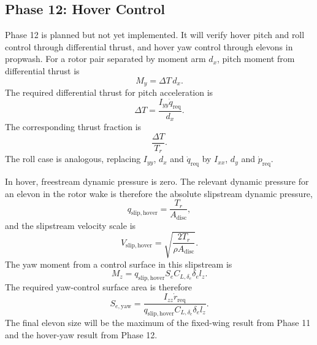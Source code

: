 \subsection{Phase 12: Hover Control}
\label{subsec:ppa_phase12}

Phase 12 is planned but not yet implemented. It will verify hover pitch and roll control through differential thrust, and hover yaw control through elevons in propwash. For a rotor pair separated by moment arm \(d_x\), pitch moment from differential thrust is
\begin{equation}
    M_y = \Delta T\,d_x .
    \label{eq:ppa_diff_thrust_pitch}
\end{equation}
The required differential thrust for pitch acceleration is
\begin{equation}
    \Delta T =
    \frac{I_{yy}\dot{q}_{\mathrm{req}}}{d_x}.
    \label{eq:ppa_required_diff_thrust_pitch}
\end{equation}
The corresponding thrust fraction is
\begin{equation}
    \frac{\Delta T}{T_r}.
    \label{eq:ppa_diff_thrust_fraction}
\end{equation}
The roll case is analogous, replacing \(I_{yy}\), \(d_x\) and \(\dot{q}_{\mathrm{req}}\) by \(I_{xx}\), \(d_y\) and \(\dot{p}_{\mathrm{req}}\).

In hover, freestream dynamic pressure is zero. The relevant dynamic pressure for an elevon in the rotor wake is therefore the absolute slipstream dynamic pressure,
\begin{equation}
    q_{\mathrm{slip,hover}} =
    \frac{T_r}{A_{\mathrm{disc}}},
    \label{eq:ppa_hover_qslip}
\end{equation}
and the slipstream velocity scale is
\begin{equation}
    V_{\mathrm{slip,hover}} =
    \sqrt{\frac{2T_r}{\rho A_{\mathrm{disc}}}}.
    \label{eq:ppa_hover_vslip}
\end{equation}
The yaw moment from a control surface in this slipstream is
\begin{equation}
    M_z =
    q_{\mathrm{slip,hover}} S_e C_{L,\delta_e}\delta_e l_z .
    \label{eq:ppa_hover_yaw_moment}
\end{equation}
The required yaw-control surface area is therefore
\begin{equation}
    S_{e,\mathrm{yaw}}
    =
    \frac{I_{zz}\dot{r}_{\mathrm{req}}}
    {q_{\mathrm{slip,hover}}C_{L,\delta_e}\delta_e l_z}.
    \label{eq:ppa_hover_yaw_area}
\end{equation}
The final elevon size will be the maximum of the fixed-wing result from Phase 11 and the hover-yaw result from Phase 12.

